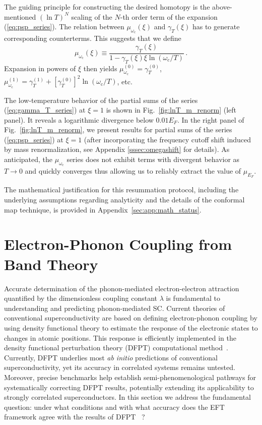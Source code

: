 \documentclass[%
 reprint,
superscriptaddress,
 amsmath,amssymb,
 aps,
prx,
]{revtex4-2}
\newcommand{\txc}{\text{c}}
\begin{document}
The guiding principle for constructing the desired homotopy is the above-mentioned $(\ln T)^N$ scaling of the $N$-th order term of the expansion (\ref{eq:psp_series}). The relation between $\mu_{\omega_\txc}(\xi)$ and $\gamma_T(\xi)$ has to generate corresponding counterterms. This suggests that we define
\begin{equation}
    \mu_{\omega_\txc}(\xi) \equiv \frac{\gamma_T(\xi)}{1-\gamma_T(\xi)\xi\ln(\omega_\txc /T) } \, .
    \label{eq:psp_resum}
\end{equation}
Expansion in powers of $\xi$ then yields  $\mu_{\omega_\txc}^{(0)} = \gamma_T^{(0)}$, $\mu_{\omega_\txc}^{(1)} = \gamma_T^{(1)} + [\gamma_T^{(0)}]^2\ln(\omega{_\txc}/T)$, etc.



The low-temperature behavior of the partial sums of the series (\ref{eq:gamma_T_series}) at $\xi=1$ is shown in 
Fig.~\ref{fig:lnT_m_renorm} (left panel). It reveals a logarithmic
divergence below $0.01E_F$.
In the right panel of Fig.~\ref{fig:lnT_m_renorm}, we present
results for partial sums of the series (\ref{eq:psp_series}) at $\xi=1$
(after incorporating the frequency cutoff shift induced by mass renormalization, see Appendix \ref{sssec:omegashift} for details). 
As anticipated, the $\mu_{\omega_\txc}$ series does not exhibit terms with
divergent behavior as $T\to 0$ and quickly converges thus allowing us to reliably extract the value of $\mu_{E_F}$.

The mathematical justification for this resummation protocol, including the underlying assumptions regarding analyticity and the details of the conformal map technique, is provided in Appendix~\ref{sec:app:math_status}.



\section{Electron-Phonon Coupling from Band Theory}
\label{sec:electronphonon}
Accurate determination of the phonon-mediated electron-electron attraction
quantified by the dimensionless coupling constant $\lambda$ is fundamental to understanding and predicting phonon-mediated SC. 
Current theories of conventional superconductivity are based on defining electron-phonon coupling by using density functional theory to estimate the response of the electronic states to changes in atomic positions. This response is efficiently implemented in the  density functional perturbation theory (DFPT) computational method~\cite{dfpt_rev,EPW1,EPW2,giustino_2017}. Currently, DFPT underlies most \emph{ab initio} predictions of conventional superconductivity, yet its accuracy in correlated systems remains untested. Moreover, precise benchmarks help establish semi-phenomenological
pathways for systematically correcting DFPT results, potentially 
extending its applicability to strongly correlated superconductors. In this section we address the fundamental question: under what conditions and with what accuracy does the EFT framework agree with the results of DFPT~\cite{dfpt_rev,EPW1,EPW2,giustino_2017} ?
\end{document}
